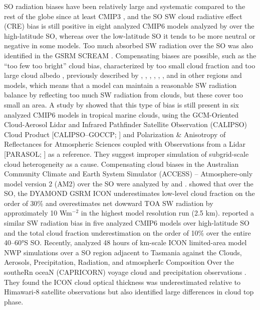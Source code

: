 \documentclass[draft]{agujournal2019}
\begin{document}
SO radiation biases have been relatively large and systematic compared to the rest of the globe since at least CMIP3 \cite{trenberth2010}, and the SO SW cloud radiative effect (CRE) bias is still positive in eight analyzed CMIP6 models analyzed by  over the high-latitude SO, whereas over the low-latitude SO it tends to be more neutral or negative in some models. Too much absorbed SW radiation over the SO was also identified in the GSRM SCREAM \cite{caldwell2021}. Compensating biases are possible, such as the ``too few too bright'' cloud bias, characterized by too small cloud fraction and too large cloud albedo \cite{wall2017,kuma2020}, previously described by , , , , , , and  in other regions and models, which means that a model can maintain a reasonable SW radiation balance by reflecting too much SW radiation from clouds, but these cover too small an area. A study by  showed that this type of bias is still present in six analyzed CMIP6 models in tropical marine clouds, using the GCM-Oriented Cloud-Aerosol Lidar and Infrared Pathfinder Satellite Observation (CALIPSO) Cloud Product [CALIPSO--GOCCP; ] and Polarization \& Anisotropy of Reflectances for Atmospheric Sciences coupled with Observations from a Lidar [PARASOL; ] as a reference. They suggest improper simulation of subgrid-scale cloud heterogeneity as a cause. Compensating cloud biases in the Australian Community Climate and Earth System Simulator (ACCESS) – Atmosphere-only model version 2 (AM2) over the SO were analyzed by  and .  showed that over the SO, the DYAMOND GSRM ICON underestimates low-level cloud fraction on the order of 30\% and overestimates net dowward TOA SW radiation by approximately 10 Wm$^\mathrm{-2}$ in the highest model resolution run (2.5 km).  reported a similar SW radiation bias in five analyzed CMIP6 models over high-latitude SO and the total cloud fraction underestimation on the order of 10\% over the entire 40--60°S SO. Recently,  analyzed 48 hours of km-scale ICON limited-area model NWP simulations over a SO region adjacent to Tasmania against the Clouds, Aerosols, Precipitation, Radiation, and atmospherIc Composition Over the southeRn oceaN (CAPRICORN) voyage cloud and precipitation observations \cite{mcfarquhar2021}. They found the ICON cloud optical thickness was underestimated relative to Himawari‐8 satellite observations but also identified large differences in cloud top phase.
\end{document}

